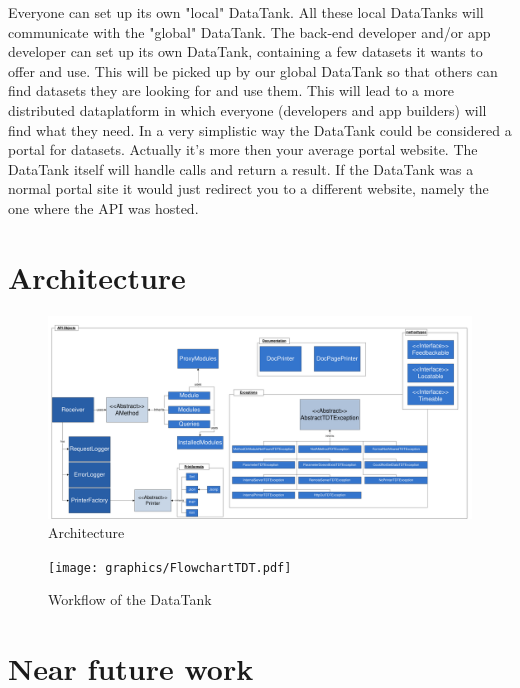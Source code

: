 \documentclass[12pt]{book}
\begin{document}
Everyone can set up its own "local" DataTank. All these local DataTanks will communicate with the "global" DataTank. The back-end developer and/or app developer can set up its own DataTank, containing a few datasets it wants to offer and use. This will be picked up by our global DataTank so that others can find datasets they are looking for and use them. This will lead to a more distributed dataplatform in which everyone (developers and app builders) will find what they need. In a very simplistic way the DataTank could be considered a portal for datasets. Actually it's more then your average portal website. The DataTank itself will handle calls and return a result. If the DataTank was a normal portal site it would just redirect you to a different website, namely the one where the API was hosted.

\chapter{Architecture}
\begin{figure}
  \centering
  \includegraphics[scale=0.4]{graphics/UMLModelTDT.pdf}
  \caption{Architecture}
  \label{fig:Architecture}
\end{figure}
\begin{figure}
 \centering
 \texttt{[image: graphics/FlowchartTDT.pdf]}
 \caption{Workflow of the DataTank}
 \label{fig:workflow}
\end{figure}
\chapter{Near future work}
\end{document}
